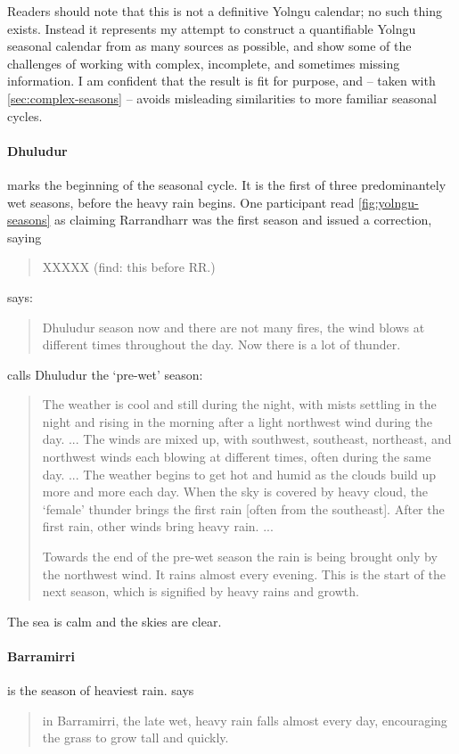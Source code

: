 Readers should note that this is not a definitive Yolngu calendar; no such
thing exists.  Instead it represents my attempt to construct a quantifiable
Yolngu seasonal calendar from as many sources as possible, and show some of
the challenges of working with complex, incomplete, and sometimes missing
information.  I am confident that the result is fit for purpose, and -- taken
with \cref{sec:complex-seasons} -- avoids misleading similarities to
more familiar seasonal cycles.


\paragraph{Dhuludur} marks the beginning of the seasonal cycle.  It is the
first of three predominantely wet seasons, before the heavy rain begins.
One participant read \cref{fig:yolngu-seasons} as claiming Rarrandharr
was the first season and issued a correction, saying \blockquote{
    XXXXX (find: this before RR.)}.

\citet[][p36]{atlas2014} says: \blockquote{
    Dhuludur season now and there are not many fires, the wind blows at
    different times throughout the day.  Now there is a lot of thunder.
}


\citet{davis1989} calls Dhuludur the `pre-wet' season: \blockquote{
    The weather is cool and still during the night, with mists settling in the night
    and rising in the morning after a light northwest wind during the day. ...
    The winds are mixed up, with southwest, southeast, northeast, and northwest winds
    each blowing at different times, often during the same day. ...
    The weather begins to get hot and humid as the clouds build up more and more each day.
    When the sky is covered by heavy cloud, the `female' thunder brings the first rain [often from the southeast].
    After the first rain, other winds bring heavy rain. ...

    Towards the end of the pre-wet season the rain is being brought only by the northwest wind.
    It rains almost every evening.
    This is the start of the next season, which is signified by heavy rains and growth.
}

The sea is calm and the skies are clear.


\paragraph{Barramirri} is the season of heaviest rain.
\citet[][p36]{atlas2014} says \blockquote{
    in Barramirri, the late wet, heavy rain falls almost every day,
    encouraging the grass to grow tall and quickly.
}

